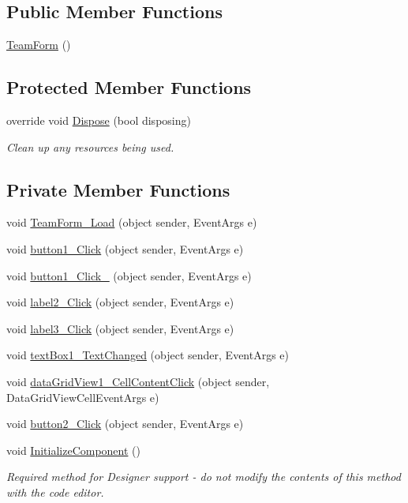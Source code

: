 \subsection*{Public Member Functions}
\begin{DoxyCompactItemize}
\item 
\hyperlink{classPCO_1_1TeamForm_ae73d439729559ea44c8912d6b9d29fa0}{Team\+Form} ()
\end{DoxyCompactItemize}
\subsection*{Protected Member Functions}
\begin{DoxyCompactItemize}
\item 
override void \hyperlink{classPCO_1_1TeamForm_a38178ba43659815e97c67f01bb13f6a7}{Dispose} (bool disposing)
\begin{DoxyCompactList}\small\item\em Clean up any resources being used. \end{DoxyCompactList}\end{DoxyCompactItemize}
\subsection*{Private Member Functions}
\begin{DoxyCompactItemize}
\item 
void \hyperlink{classPCO_1_1TeamForm_a1e2c2a418c5d492ff838f336979c47ff}{Team\+Form\+\_\+\+Load} (object sender, Event\+Args e)
\item 
void \hyperlink{classPCO_1_1TeamForm_adfeb099cd1dfd602bb850fb481a473ea}{button1\+\_\+\+Click} (object sender, Event\+Args e)
\item 
void \hyperlink{classPCO_1_1TeamForm_a708f7c82354169ea5f8501d0bd9e0d1a}{button1\+\_\+\+Click\+\_} (object sender, Event\+Args e)
\item 
void \hyperlink{classPCO_1_1TeamForm_ae98164f0e99f29557c35469746d4e8da}{label2\+\_\+\+Click} (object sender, Event\+Args e)
\item 
void \hyperlink{classPCO_1_1TeamForm_ac4e9ada5ea75e8f396dd3abaf5771a4f}{label3\+\_\+\+Click} (object sender, Event\+Args e)
\item 
void \hyperlink{classPCO_1_1TeamForm_a2b1fa1f5a871fefa62572d40ca8a2ddb}{text\+Box1\+\_\+\+Text\+Changed} (object sender, Event\+Args e)
\item 
void \hyperlink{classPCO_1_1TeamForm_a8909ba541f3716ee9658a65347d2e3ec}{data\+Grid\+View1\+\_\+\+Cell\+Content\+Click} (object sender, Data\+Grid\+View\+Cell\+Event\+Args e)
\item 
void \hyperlink{classPCO_1_1TeamForm_a9b390ea8ac6520eb2f875f77bcb1e139}{button2\+\_\+\+Click} (object sender, Event\+Args e)
\item 
void \hyperlink{classPCO_1_1TeamForm_a2748b745e9cf7e117c393a42e38aec5a}{Initialize\+Component} ()
\begin{DoxyCompactList}\small\item\em Required method for Designer support -\/ do not modify the contents of this method with the code editor. \end{DoxyCompactList}\end{DoxyCompactItemize}
